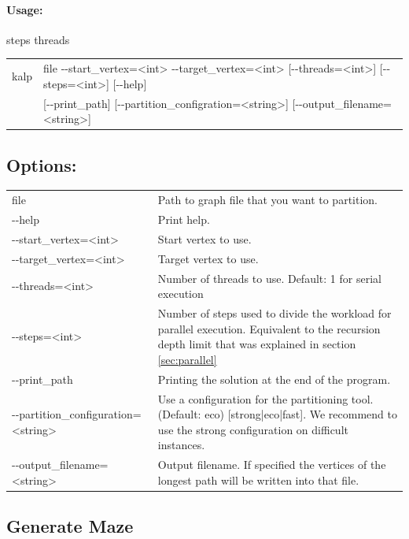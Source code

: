 \documentclass[11pt]{article}
\begin{document}
\paragraph*{Usage:\\} 

steps threads

\begin{tabular}{ll}
kalp &   file  -{}-start\_vertex=<int> -{}-target\_vertex=<int> [-{}-threads=<int>] [-{}-steps=<int>] [-{}-help]\\
       &  [-{}-print\_path] [-{}-partition\_configration=<string>] [-{}-output\_filename=<string>] \\
\end{tabular}
                          
\subsection*{Options:\\}

\begin{tabularx}{\textwidth}{lX}
  file                        & Path to graph file that you want to partition. \\
  -{}-help                      & Print help. \\
  -{}-start\_vertex=<int> & Start vertex to use. \\
  -{}-target\_vertex=<int> & Target vertex to use. \\
  -{}-threads=<int> & Number of threads to use. Default: 1 for serial execution\\
  -{}-steps=<int> & Number of steps used to divide the workload for parallel execution. Equivalent to the recursion depth limit that was explained in section \ref{sec:parallel}\\
  -{}-print\_path & Printing the solution at the end of the program.  \\
  -{}-partition\_configuration=<string> & Use a configuration for the partitioning tool. (Default: eco) [strong|eco|fast]. We recommend to use the strong configuration on difficult instances. \\
  -{}-output\_filename=<string>               & Output filename. If specified the vertices of the longest path will be written into that file. \\
\end{tabularx}
\subsection{Generate Maze}
\end{document}
